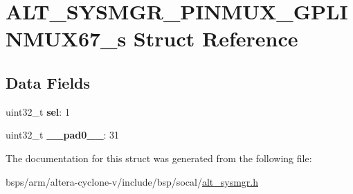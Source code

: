 \hypertarget{structALT__SYSMGR__PINMUX__GPLINMUX67__s}{}\section{A\+L\+T\+\_\+\+S\+Y\+S\+M\+G\+R\+\_\+\+P\+I\+N\+M\+U\+X\+\_\+\+G\+P\+L\+I\+N\+M\+U\+X67\+\_\+s Struct Reference}
\label{structALT__SYSMGR__PINMUX__GPLINMUX67__s}
\subsection*{Data Fields}
\begin{DoxyCompactItemize}
\item 
\mbox{\label{structALT__SYSMGR__PINMUX__GPLINMUX67__s_a757e782b30108304327e87e3895dc236}} 
uint32\+\_\+t {\bfseries sel}\+: 1
\item 
\mbox{\label{structALT__SYSMGR__PINMUX__GPLINMUX67__s_a7789c7436c34bf5a73792a0565e907d6}} 
uint32\+\_\+t {\bfseries \+\_\+\+\_\+pad0\+\_\+\+\_\+}\+: 31
\end{DoxyCompactItemize}


The documentation for this struct was generated from the following file\+:\begin{DoxyCompactItemize}
\item 
bsps/arm/altera-\/cyclone-\/v/include/bsp/socal/\mbox{\hyperlink{alt__sysmgr_8h}{alt\+\_\+sysmgr.\+h}}\end{DoxyCompactItemize}
